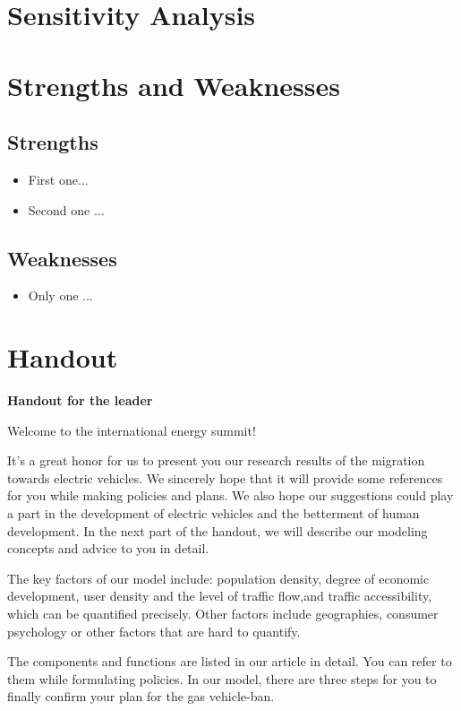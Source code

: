 \documentclass[12pt]{article}  %
\begin{document}
\section{Sensitivity Analysis}

\section{Strengths and Weaknesses}
\subsection{Strengths}
\begin{itemize}
    \item First one...
    \item Second one ...
\end{itemize}

\subsection{Weaknesses}
\begin{itemize}
    \item Only one ...
 \end{itemize}


\clearpage
\section{Handout}
\begin{center}
	\textbf{Handout for the leader}
\end{center}

Welcome to the international energy summit!

It’s a great honor for us to present you our research results of the migration towards electric vehicles. We sincerely hope that it will provide some references for you while making policies and plans. We also hope our suggestions could play a part in the development of electric vehicles and the betterment of human development. In the next part of the handout, we will describe our modeling concepts and advice to you in detail.

The key factors of our model include: population density, degree of economic development, user density and the level of traffic flow,and traffic accessibility, which can be quantified precisely. Other factors include geographies, consumer psychology or other factors that are hard to quantify.

The components and functions are listed in our article in detail. You can refer to them while formulating policies. In our model, there are three steps for you to finally confirm your plan for the gas vehicle-ban.
\end{document}
